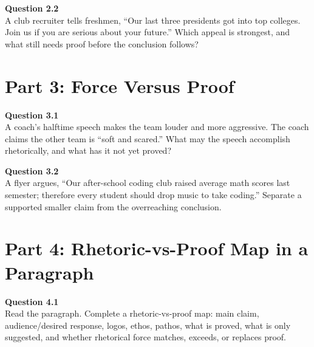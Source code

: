 \documentclass[12pt]{article}
\begin{document}

\textbf{Question 2.2}\\[-0.15em]
A club recruiter tells freshmen, ``Our last three presidents got into top colleges. Join us if you are serious about your future.'' Which appeal is strongest, and what still needs proof before the conclusion follows?


\newpage

\section*{Part 3: Force Versus Proof}

\textbf{Question 3.1}\\[-0.15em]
A coach's halftime speech makes the team louder and more aggressive. The coach claims the other team is ``soft and scared.'' What may the speech accomplish rhetorically, and what has it not yet proved?


\textbf{Question 3.2}\\[-0.15em]
A flyer argues, ``Our after-school coding club raised average math scores last semester; therefore every student should drop music to take coding.'' Separate a supported smaller claim from the overreaching conclusion.


\newpage

\section*{Part 4: Rhetoric-vs-Proof Map in a Paragraph}

\textbf{Question 4.1}\\[-0.15em]
Read the paragraph. Complete a rhetoric-vs-proof map: main claim, audience/desired response, logos, ethos, pathos, what is proved, what is only suggested, and whether rhetorical force matches, exceeds, or replaces proof.

\vspace{0.2em}

\noindent{}
\end{document}
